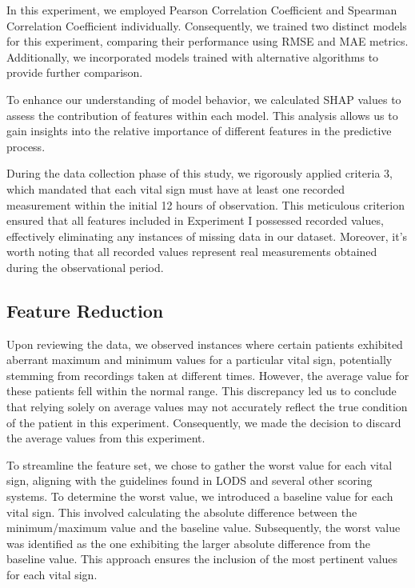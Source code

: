 \documentclass[12pt,a4paper,english
]{tunithesis}
\begin{document}
In this experiment, we employed Pearson Correlation Coefficient and Spearman Correlation Coefficient individually. Consequently, we trained two distinct models for this experiment, comparing their performance using RMSE and MAE metrics. Additionally, we incorporated models trained with alternative algorithms to provide further comparison.

To enhance our understanding of model behavior, we calculated SHAP values to assess the contribution of features within each model. This analysis allows us to gain insights into the relative importance of different features in the predictive process.

During the data collection phase of this study, we rigorously applied criteria 3, which mandated that each vital sign must have at least one recorded measurement within the initial 12 hours of observation. This meticulous criterion ensured that all features included in Experiment I possessed recorded values, effectively eliminating any instances of missing data in our dataset. Moreover, it's worth noting that all recorded values represent real measurements obtained during the observational period. 

\subsection{Feature Reduction}
Upon reviewing the data, we observed instances where certain patients exhibited aberrant maximum and minimum values for a particular vital sign, potentially stemming from recordings taken at different times. However, the average value for these patients fell within the normal range. This discrepancy led us to conclude that relying solely on average values may not accurately reflect the true condition of the patient in this experiment. Consequently, we made the decision to discard the average values from this experiment. 

To streamline the feature set, we chose to gather the worst value for each vital sign, aligning with the guidelines found in LODS and several other scoring systems. To determine the worst value, we introduced a baseline value for each vital sign. This involved calculating the absolute difference between the minimum/maximum value and the baseline value. Subsequently, the worst value was identified as the one exhibiting the larger absolute difference from the baseline value. This approach ensures the inclusion of the most pertinent values for each vital sign.
\end{document}
